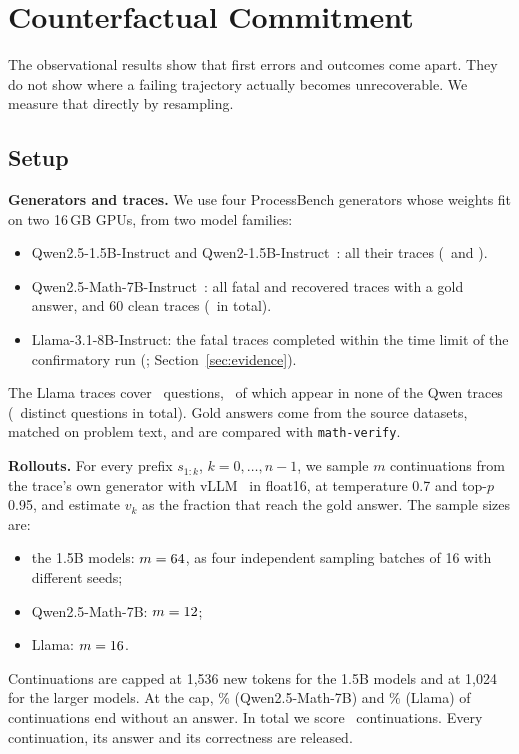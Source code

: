 \section{Counterfactual Commitment}\label{sec:counterfactual}
The observational results show that first errors and outcomes come apart. They do not show where a
failing trajectory actually becomes unrecoverable. We measure that directly by resampling.

\subsection{Setup}
\textbf{Generators and traces.} We use four ProcessBench generators whose weights fit on two
16\,GB GPUs, from two model families:
\begin{itemize}
\item Qwen2.5-1.5B-Instruct and Qwen2-1.5B-Instruct~\cite{qwen25}: all their traces
(\QwenSmallAllN\ and \QwenTwoAllN).
\item Qwen2.5-Math-7B-Instruct~\cite{qwen25math}: all fatal and recovered traces with a gold answer,
and 60 clean traces (\QwenMathN\ in total).
\item Llama-3.1-8B-Instruct: the fatal traces completed within the time limit of the confirmatory
run (\LlamaN; Section~\ref{sec:evidence}).
\end{itemize}
The Llama traces cover \QuestionsLlama\ questions, \QuestionsLlamaNew\ of which appear in none of the
Qwen traces (\QuestionsUnion\ distinct questions in total). Gold answers come from the source datasets,
matched on problem text, and are compared with \texttt{math-verify}.

\textbf{Rollouts.} For every prefix $s_{1:k}$, $k=0,\dots,n-1$, we sample $m$ continuations from the
trace's own generator with vLLM~\cite{vllm} in float16, at temperature 0.7 and top-$p$ 0.95, and
estimate $v_k$ as the fraction that reach the gold answer. The sample sizes are:
\begin{itemize}
\item the 1.5B models: $m=64$, as four independent sampling batches of 16 with different
seeds;
\item Qwen2.5-Math-7B: $m=12$;
\item Llama: $m=16$.
\end{itemize}
Continuations are capped at 1,536 new tokens for the 1.5B models and at 1,024 for the larger
models. At the cap, \QwenMathTruncPct\% (Qwen2.5-Math-7B) and \LlamaTruncPct\% (Llama) of
continuations end without an answer. In total we score \TotalRollouts\ continuations. Every
continuation, its answer and its correctness are released.

